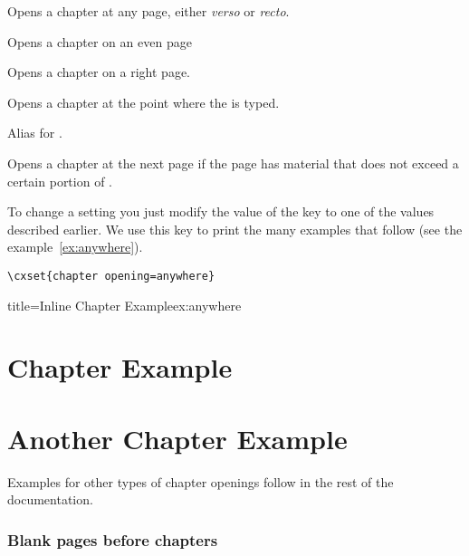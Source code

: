 \begin{marglist}
\item [any] Opens a chapter at any page, either \textit{verso} or \textit{recto}.
\item [left] Opens a chapter on an even page
\item [right] Opens a chapter on a right page.
\item [anywhere] Opens a chapter at the point where the  is typed.
\item [none] Alias for .
\item [ifafter] Opens a chapter at the next page if the page has material that does not exceed a certain portion of .
\end{marglist}

To change a setting you just modify the value of the key  to one of the values described earlier. We use this key to print the many examples that follow (see the example~\ref{ex:anywhere}). 



\begin{tcolorbox}
\begin{lstlisting}
\cxset{chapter opening=anywhere}
\end{lstlisting}
\end{tcolorbox}

\makeatletter
\@specialfalse
\makeatother

\begin{texexample}{title=Inline Chapter Example}{ex:anywhere}
\lorem
\chapter{Chapter Example}
\lorem
\chapter{Another Chapter Example}
\lorem
\end{texexample}


\addtocounter{chapter}{-1}

Examples for other types of chapter openings follow in the rest of the documentation.

\subsection{Blank pages before chapters}

